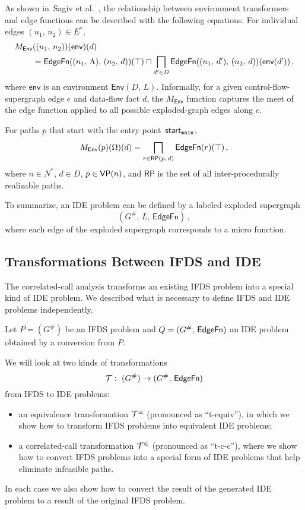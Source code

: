 As shown in~Sagiv et al.~\cite{sagiv1996precise}, the relationship between environment transformers and edge functions can be described with the following equations. For individual edges $(n_1,\,n_2)\in E^*$,
\begin{align}\label{eq:envTransToEdgeFnEdge}
  M_\textsf{Env}&((n_1,\,n_2))(\textsf{env})(d)\notag\\
  &=\textsf{EdgeFn}((n_1,\,\Lambda),\,(n_2,\,d))(\top)\sqcap\bigsqcap_{d'\in D}\textsf{EdgeFn}((n_1,\,d'),\,(n_2,\,d))(\textsf{env}(d'))\,,
\end{align}
where $\textsf{env}$ is an environment $\textsf{Env}(D,\,L)$. Informally, for a given control-flow-supergraph edge $e$ and data-flow fact $d$, the $M_\textsf{Env}$ function captures the meet of the edge function applied to all possible exploded-graph edges along $e$.

For paths $p$ that start with the entry point~$\textsf{start}_\texttt{main}$,
\begin{equation}\label{eq:envTransToEdgefn}
  M_\textsf{Env}(p)(\Omega)(d)=\bigsqcap_{r\in\mathsf{RP}(p,\,d)}\textsf{EdgeFn}(r)(\top)\,,
\end{equation}
where $n\in N^*$, $d\in D$, $p\in\textsf{VP}(n)$, and $\mathsf{RP}$ is the set of all inter-procedurally realizable paths.

To summarize, an IDE problem can be defined by a labeled exploded supergraph 
\begin{equation}(G^\#,\,L,\,\mathsf{EdgeFn})\,,\end{equation}
where each edge of the exploded supergraph corresponds to a micro function.

\subsection{Transformations Between IFDS and IDE}\label{seq:transIfdsIde}

The correlated-call analysis transforms an existing IFDS problem into a special kind of IDE problem. We described what is necessary to define IFDS and IDE problems independently.

Let $P=(G^\#)$ be an IFDS problem and $Q=(G^\#,\,\textsf{EdgeFn})$ an IDE problem obtained by a conversion from $P$.

We will look at two kinds of transformations
\begin{equation}
  \mathcal T:\ (G^\#)\to (G^\#,\,\textsf{EdgeFn})
\end{equation}
from IFDS to IDE problems:
\begin{itemize}
	\item an equivalence transformation $\mathcal T^\equiv$ (pronounced as ``t-equiv''), in which we show how to transform IFDS problems into equivalent IDE problems;
  \item a correlated-call transformation $\mathcal T^\Subset$ (pronounced as ``t-c-c''), where we show how to convert IFDS problems into a special form of IDE problems that help eliminate infeasible paths.
\end{itemize}
In each case we also show how to convert the result of the generated IDE problem to a result of the original IFDS problem.

